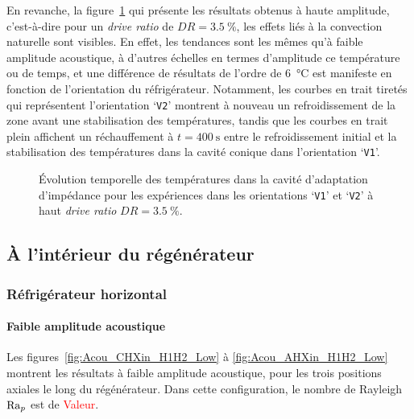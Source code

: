 En revanche, la figure~\ref{fig:Acou_CHXout_V1V2_High} qui présente les résultats obtenus à haute amplitude, c'est-à-dire pour un \textit{drive ratio} de $DR=\qty{3.5}{\percent}$, les effets liés à la convection naturelle sont visibles. En effet, les tendances sont les mêmes qu'à faible amplitude acoustique, à d'autres échelles en termes d'amplitude ce température ou de temps, et une différence de résultats de l'ordre de \qty{6}{\degreeCelsius} est manifeste en fonction de l'orientation du réfrigérateur. Notamment, les courbes en trait tiretés qui représentent l'orientation `\texttt{V2}' montrent à nouveau un refroidissement de la zone avant une stabilisation des températures, tandis que les courbes en trait plein affichent un réchauffement à $t=\qty{400}{\second}$ entre le refroidissement initial et la stabilisation des températures dans la cavité conique dans l'orientation `\texttt{V1}'.

\begin{figure}[!ht]
    \centering
    
    \caption{\'Evolution temporelle des températures dans la cavité d'adaptation d'impédance pour les expériences dans les orientations `\texttt{V1}' et `\texttt{V2}' à haut \textit{drive ratio} $DR=\qty{3.5}{\percent}$.}
    \label{fig:Acou_CHXout_V1V2_High}
\end{figure}



\subsection{À l'intérieur du régénérateur}
\subsubsection{Réfrigérateur horizontal}
\paragraph{Faible amplitude acoustique}
Les figures~\ref{fig:Acou_CHXin_H1H2_Low} à \ref{fig:Acou_AHXin_H1H2_Low} montrent les résultats à faible amplitude acoustique, pour les trois positions axiales le long du régénérateur. Dans cette configuration, le nombre de Rayleigh $\mathrm{Ra}_p$ est de \textcolor{red}{Valeur}. 

